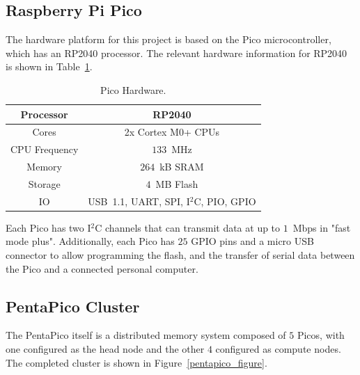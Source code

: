 \documentclass[conference]{IEEEtran}
\begin{document}
\subsection{Raspberry Pi Pico}

The hardware platform for this project is based on the Pico microcontroller, which has an RP2040 processor. 
The relevant hardware information for RP2040 is shown in Table~\ref{pico_hardware_table}.

\begin{table}[ht]
\centering
\caption{Pico Hardware.}
\label{pico_hardware_table}
\begin{tabular}{|c|c|}
\hline
Processor & RP2040 \\
\hline
Cores & 2x Cortex M0+ CPUs  \\
\hline
CPU Frequency & $133$~MHz\\
\hline
Memory & $264$~kB SRAM  \\
\hline
Storage & $4$~MB Flash \\
\hline
IO & USB~1.1, UART, SPI, I$^2$C, PIO, GPIO \\
\hline
\end{tabular}
\end{table}

Each Pico has two I$^2$C channels that can transmit data at up to $1$~Mbps in "fast mode plus".
Additionally, each Pico has $25$ GPIO pins and a micro USB connector to allow programming the flash, and the transfer of serial data between the Pico and a connected personal computer.

\subsection{PentaPico Cluster}

The PentaPico itself is a distributed memory system composed of $5$ Picos, with one configured as the head node and the other $4$ configured as compute nodes.
The completed cluster is shown in Figure~\ref{pentapico_figure}.
\end{document}
